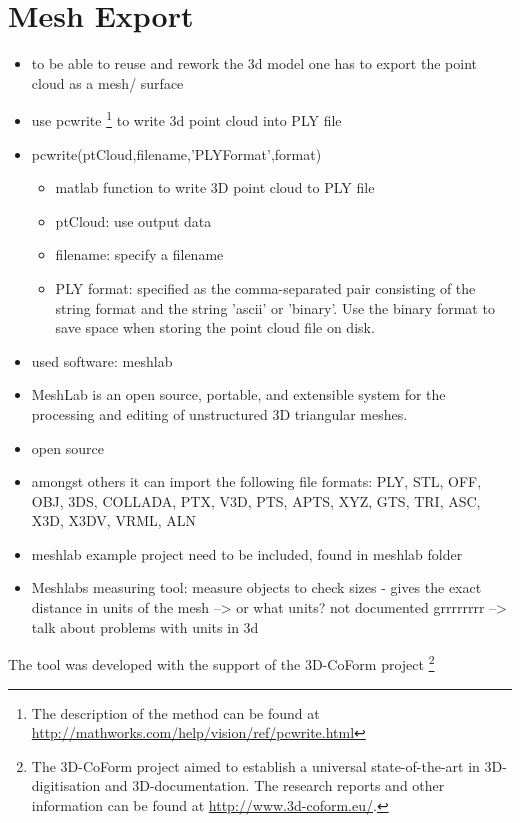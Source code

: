 \section{Mesh Export}
	
\begin{itemize}
\item to be able to reuse and rework the 3d model one has to export the point cloud as a mesh/ surface
\item use pcwrite \footnote{The description of the method can be found at \url{http://mathworks.com/help/vision/ref/pcwrite.html}} to write 3d point cloud into PLY file
\item pcwrite(ptCloud,filename,'PLYFormat',format) 
	\begin{itemize}
	\item matlab function to write 3D point cloud to PLY file
	\item ptCloud: use output data
	\item filename: specify a filename
	\item PLY format: specified as the comma-separated pair consisting of the string format and the string 'ascii' or 'binary'. Use the binary format to save space when storing the point cloud file on disk.
	\end{itemize}


\item used software: meshlab \cite{Meshlab.2016}
\item MeshLab is an open source, portable, and extensible system for the processing and editing of unstructured 3D triangular meshes.
\item open source
\item amongst others it can import the following file formats: PLY, STL, OFF, OBJ, 3DS, COLLADA, PTX, V3D, PTS, APTS, XYZ, GTS, TRI, ASC, X3D, X3DV, VRML, ALN
\item meshlab example project need to be included, found in meshlab folder
\item Meshlabs measuring tool: measure objects to check sizes - gives the exact distance in units of the mesh --> or what units? not documented grrrrrrrr --> talk about problems with units in 3d
\end{itemize}


The tool was developed with the support of the 3D-CoForm project \footnote{The 3D-CoForm project aimed to establish a universal state-of-the-art in 3D-digitisation and 3D-documentation. The research reports and other information can be found at \url{http://www.3d-coform.eu/}.}

